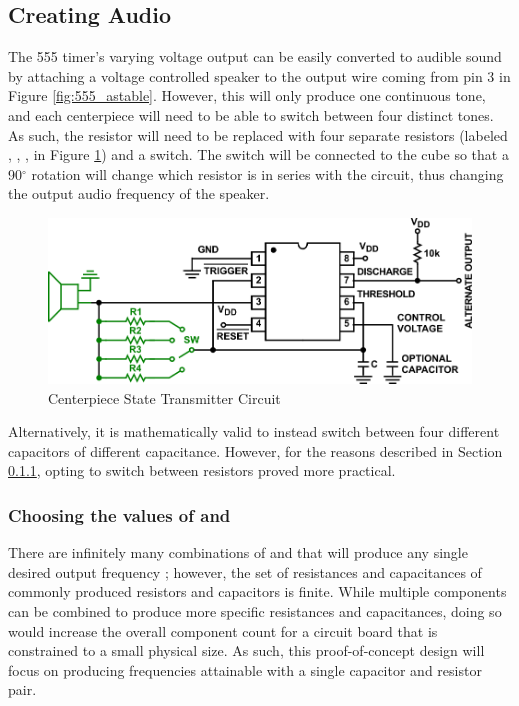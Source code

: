 \subsection{Creating Audio}
The 555 timer's varying voltage output can be easily converted to audible sound  by attaching a voltage controlled speaker to the output wire coming from pin 3 in Figure \ref{fig:555_astable}.
However, this will only produce one continuous tone, and each centerpiece will need to be able to switch between four distinct tones.
As such, the resistor  will need to be replaced with four separate resistors (labeled , , ,  in Figure \ref{fig:555_astable_modded}) and a switch.
The switch will be connected to the cube so that a 90$^\circ$ rotation will change which resistor is in series with the circuit, thus changing the output audio frequency of the speaker.
\begin{figure}[h]
    \centering
    \caption{Centerpiece State Transmitter Circuit}
    \label{fig:555_astable_modded}
    \includegraphics[width=\linewidth]{Figures/6 PCB Design/555_astable_modded.png}
\end{figure}

Alternatively, it is mathematically valid to instead switch between four different capacitors of different capacitance.
However, for the reasons described in Section \ref{subsubsec:freq-selection}, opting to switch between resistors proved more practical.

\subsubsection{Choosing the values of  and }
\label{subsubsec:freq-selection}
There are infinitely many combinations of  and  that will produce any single desired output frequency ; however, the set of resistances and capacitances of commonly produced resistors and capacitors is finite.
While multiple components can be combined to produce more specific resistances and capacitances, doing so would increase the overall component count for a circuit board that is constrained to a small physical size.
As such, this proof-of-concept design will focus on producing frequencies attainable with a single capacitor and resistor pair.

